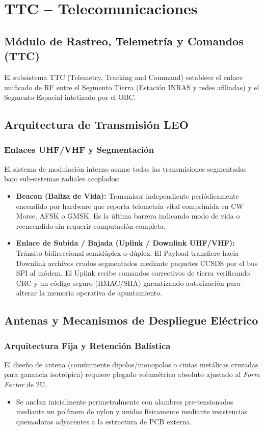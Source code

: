 \chapter{TTC – Telecomunicaciones}

\section{Módulo de Rastreo, Telemetría y Comandos (TTC)}
El subsistema TTC (Telemetry, Tracking and Command) establece el enlace unificado de RF entre el Segmento Tierra (Estación INRAS y redes afiliadas) y el Segmento Espacial intetizado por el OBC.

\section{Arquitectura de Transmisión LEO}

\subsection{Enlaces UHF/VHF y Segmentación}
El sistema de modulación interno asume todas las transmisiones segmentadas bajo sub-sistemas radiales acoplados:
\begin{itemize}
    \item \textbf{Beacon (Baliza de Vida):} Transmisor independiente periódicamente encendido por hardware que reporta telemetría vital comprimida en CW Morse, AFSK o GMSK. Es la última barrera indicando modo de vida o reencendido sin requerir computación completa.
    \item \textbf{Enlace de Subida / Bajada (Uplink / Downlink UHF/VHF):} Tránsito bidireccional semidúplex o dúplex. El Payload transfiere hacia Downlink archivos crudos segmentados mediante paquetes CCSDS por el bus SPI al módem. El Uplink recibe comandos correctivos de tierra verificando CRC y un código seguro (HMAC/SHA) garantizando autorización para alterar la memoria operativa de apuntamiento.
\end{itemize}

\section{Antenas y Mecanismos de Despliegue Eléctrico}
\subsection{Arquitectura Fija y Retención Balística}
El diseño de antena (comúnmente dipolos/monopolos o cintas metálicas cruzadas para ganancia isotrópica) requiere plegado volumétrico absoluto ajustado al \textit{Form Factor} de 2U.
\begin{itemize}
    \item Se anclan inicialmente perimetralmente con alambres pre-tensionados mediante un polímero de nylon y unidos físicamente mediante resistencias quemadoras adyacentes a la estructura de PCB externa.
\end{itemize}

